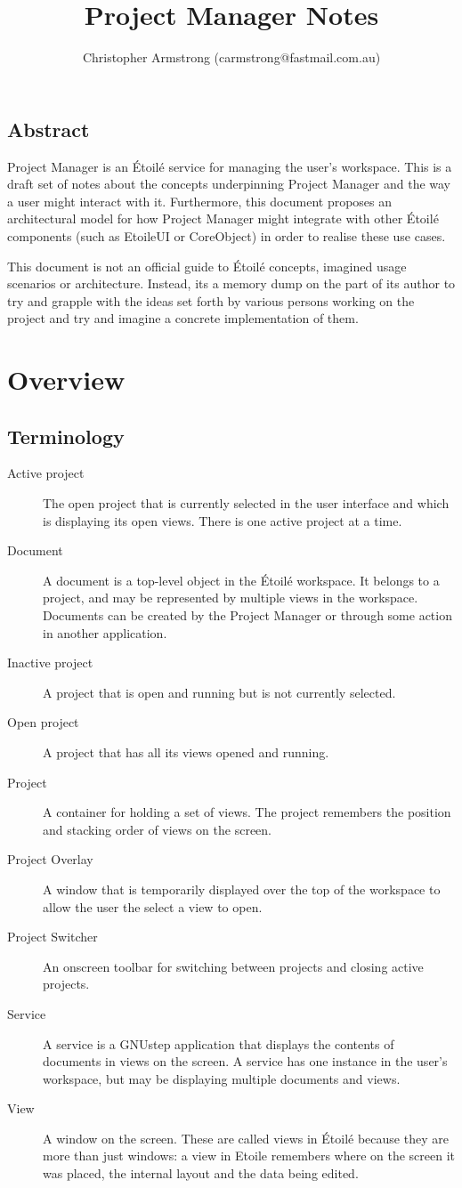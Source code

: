 \documentclass[11pt]{report}
\title{Project Manager Notes}
\author{Christopher Armstrong (carmstrong@fastmail.com.au)}
\newcommand{\etoile}{\'Etoil\'e\xspace}
\newcommand{\proman}{Project Manager\xspace}
\begin{document}
\maketitle
\tableofcontents
\section{Abstract}
\proman is an \etoile service for managing the user's workspace. This is a draft set of notes about the concepts underpinning \proman and the way a user might interact with it. Furthermore, this document proposes an architectural model for how \proman might integrate with other \etoile components (such as EtoileUI or CoreObject) in order to realise these use cases.

This document is not an official guide to \etoile concepts, imagined usage scenarios or architecture. Instead, its a memory dump on the part of its author to try and grapple with the ideas set forth by various persons working on the project and try and imagine a concrete implementation of them.

\chapter{Overview}
\section{Terminology}
\begin{description}
\item[Active project] The open project that is currently selected in the user interface and which is displaying its open views. There is one active project at a time.
\item[Document] A document is a top-level object in the \etoile workspace. It belongs to a project, and may be represented by multiple views in the workspace. Documents can be created by the \proman or through some action in another application.
\item[Inactive project] A project that is open and running but is not currently selected. 
\item[Open project] A project that has all its views opened and running.
\item[Project] A container for holding a set of views. The project remembers the position and stacking order of views on the screen.
\item[Project Overlay] A window that is temporarily displayed over the top of the workspace to allow the user the select a view to open.
\item[Project Switcher] An onscreen toolbar for switching between projects and closing active projects.
\item[Service] A service is a GNUstep application that displays the contents of documents in views on the screen. A service has one instance in the user's workspace, but may be displaying multiple documents and views.
\item[View] A window on the screen. These are called views in \etoile because they are more than just windows: a view in Etoile remembers where on the screen it was placed, the internal layout and the data being edited.
\end{description}
\end{document}

